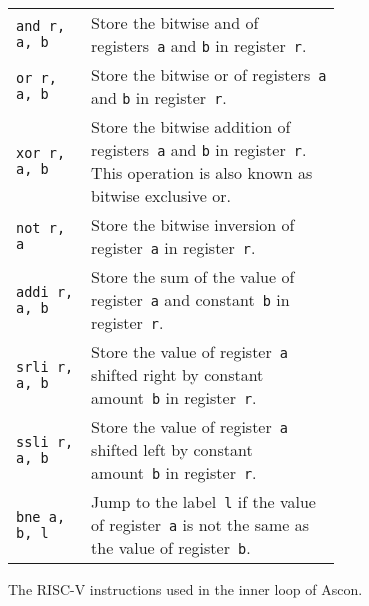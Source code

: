 \begin{figure}
\begin{tabular}{l p{0.77\linewidth}}
       \texttt{and r, a, b} & Store the bitwise and of registers~\texttt{a} and
        \texttt{b} in register~\texttt{r}.
    \\ \texttt{or r, a, b} & Store the bitwise or of registers~\texttt{a} and
        \texttt{b} in register~\texttt{r}.
    \\ \texttt{xor r, a, b} & Store the bitwise addition of registers~\texttt{a}
        and \texttt{b} in register~\texttt{r}. This operation is also known as
        bitwise exclusive or.
    \\ \texttt{not r, a} & Store the bitwise inversion of register~\texttt{a} in
        register~\texttt{r}.
    \\ \texttt{addi r, a, b} & Store the sum of the value of register~\texttt{a}
        and constant~\texttt{b} in register~\texttt{r}.
    \\ \texttt{srli r, a, b} & Store the value of register~\texttt{a} shifted
        right by constant amount~\texttt{b} in register~\texttt{r}.
    \\ \texttt{ssli r, a, b} & Store the value of register~\texttt{a} shifted
        left by constant amount~\texttt{b} in register~\texttt{r}.
    \\ \texttt{bne a, b, l} & Jump to the label~\texttt{l} if the value of
        register~\texttt{a} is not the same as the value of register~\texttt{b}.
\end{tabular}

\caption{The RISC-V instructions used in the inner loop of Ascon.}

\label{opcodes}
\end{figure}
